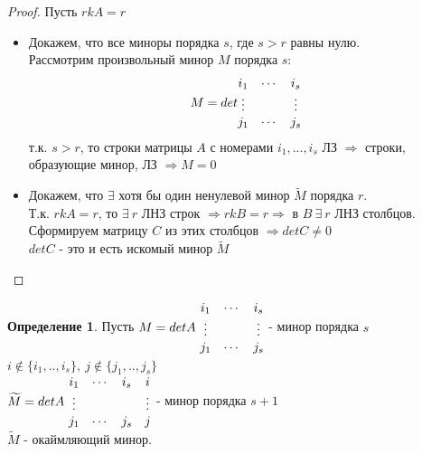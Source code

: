 \documentclass[a4paper, 12pt]{article}
\theoremstyle{definition}
\newtheorem*{definition}{Определение}
\begin{document}
  \begin{proof}
    Пусть $rkA = r$ 
    \begin{itemize}
      \item Докажем, что все миноры порядка $s$, где $s>r$ равны нулю. \\
      Рассмотрим произвольный минор $M$ порядка $s$: $$M = det\begin{matrix}
        i_1 & \cdots & i_s \\
        \vdots & \null & \vdots \\
        j_1 & \cdots & j_s
      \end{matrix}$$ 
      т.к. $s>r$, то строки матрицы $A$ с номерами $i_1,...,i_s$ ЛЗ $\Longrightarrow $ строки, образующие минор, ЛЗ $\Longrightarrow M=0$ 
      \item Докажем, что $\exists$ хотя бы один ненулевой минор $\widetilde{M}$ порядка $r$. \\
      Т.к. $rkA = r$, то $\exists \ r$ ЛНЗ строк $\Longrightarrow rkB = r \Longrightarrow $ в $B \ \exists \ r $ ЛНЗ столбцов. Сформируем матрицу $C$ из этих столбцов $\Longrightarrow detC \not = 0$ \\
      $detC$ - это и есть искомый минор $\widetilde{M}$     
    \end{itemize}
  \end{proof} 
  \begin{definition}
     Пусть $M = detA \ \begin{matrix}
      i_1 & \cdots & i_s \\
      \vdots & \null & \vdots \\
      j_1 & \cdots & j_s
    \end{matrix}$ - минор порядка $s$ \\
    $i \not \in \{i_1,..,i_s\}, \ j \not \in \{j_1,..,j_s\}$ \vspace{0.3cm}\\
    $\widetilde{M} = detA \ \begin{matrix}
      i_1 & \cdots & i_s & i \\
      \vdots & \null & \null & \vdots \\
      j_1 & \cdots & j_s & j
    \end{matrix}$ - минор порядка  $s+1$ \\
    $\widetilde{M}$ - окаймляющий минор.  
  \end{definition} 
\end{document}
